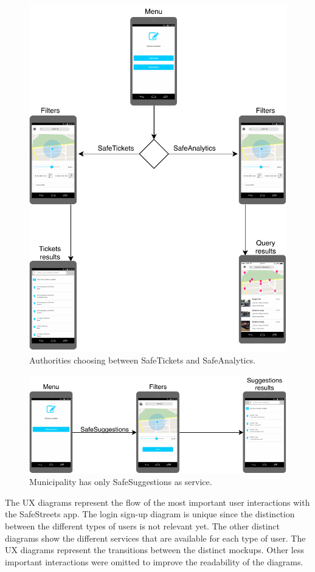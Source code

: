 \documentclass[./main.tex]{subfiles}
\begin{document}
\begin{figure}[H]
\centering
\includegraphics[]{resources/UXflow/aux}
\caption{Authorities choosing between SafeTickets and SafeAnalytics.}
\end{figure}

\begin{figure}[H]
\centering
\includegraphics[]{resources/UXflow/mux}
\caption{Municipality has only SafeSuggestions as service.}
\end{figure}

The UX diagrams represent the flow of the most important user interactions with the SafeStreets app. The login sign-up diagram is unique since the distinction between the different types of users is not relevant yet. The other distinct diagrams show the different services that are available for each type of user. The UX diagrams represent the transitions between the distinct mockups. 
Other less important interactions were omitted to improve the readability of the diagrams.
\end{document}
